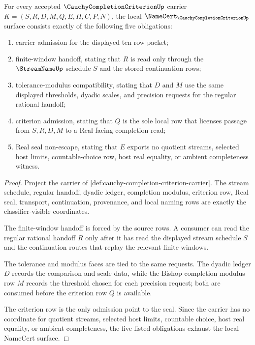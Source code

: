 \begin{theorem}
\label{thm:cauchy-completion-criterion-namecert-obligations}
For every accepted $\CauchyCompletionCriterionUp$ carrier $K=(S,R,D,M,Q,E,H,C,P,N)$, the local $\NameCert_{\CauchyCompletionCriterionUp}$ surface consists exactly of the following five obligations:
\begin{enumerate}
\item carrier admission for the displayed ten-row packet;
\item finite-window handoff, stating that $R$ is read only through the $\StreamNameUp$ schedule $S$ and the stored continuation rows;
\item tolerance-modulus compatibility, stating that $D$ and $M$ use the same displayed thresholds, dyadic scales, and precision requests for the regular rational handoff;
\item criterion admission, stating that $Q$ is the sole local row that licenses passage from $S,R,D,M$ to a Real-facing completion read;
\item Real seal non-escape, stating that $E$ exports no quotient streams, selected host limits, countable-choice row, host real equality, or ambient completeness witness.
\end{enumerate}
\end{theorem}
\begin{proof}
Project the carrier of \autoref{def:cauchy-completion-criterion-carrier}. The stream schedule, regular handoff, dyadic ledger, completion modulus, criterion row, Real seal, transport, continuation, provenance, and local naming rows are exactly the classifier-visible coordinates.

The finite-window handoff is forced by the source rows. A consumer can read the regular rational handoff $R$ only after it has read the displayed stream schedule $S$ and the continuation routes that replay the relevant finite windows.

The tolerance and modulus faces are tied to the same requests. The dyadic ledger $D$ records the comparison and scale data, while the Bishop completion modulus row $M$ records the threshold chosen for each precision request; both are consumed before the criterion row $Q$ is available.

The criterion row is the only admission point to the seal. Since the carrier has no coordinate for quotient streams, selected host limits, countable choice, host real equality, or ambient completeness, the five listed obligations exhaust the local NameCert surface.
\end{proof}

